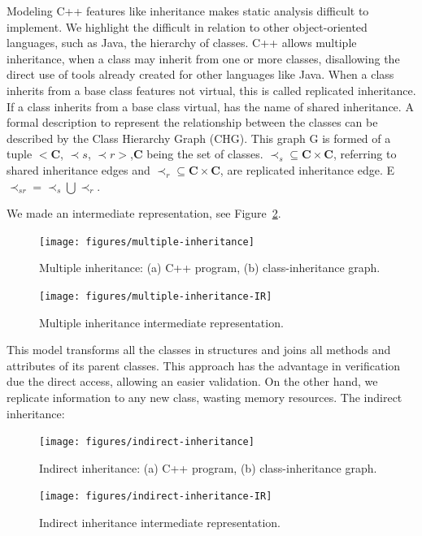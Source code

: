 \documentclass[a4paper]{llncs}
\begin{document}
Modeling C++ features like inheritance makes static analysis difficult to implement. We highlight the difficult in relation to other 
object-oriented languages, such as Java, the hierarchy of classes. C++ allows multiple inheritance, when a class may inherit from 
one or more classes, disallowing the direct use of tools already created for other languages like Java.
When a class inherits from a base class features not virtual, this is called replicated inheritance. If a class inherits from a base 
class virtual, has the name of shared inheritance.
A formal description to represent the relationship between the classes can be described by the Class Hierarchy Graph (CHG). 
This graph G is formed of a tuple $<$\textbf{C},  $\prec s$, $\prec r>$,\textbf{C} being the set of classes. $ 
\prec_s \subseteq \textbf{C} \times \textbf{C}$, referring to shared inheritance edges and $\prec_r \subseteq 
\textbf{C} \times \textbf{C}$, are replicated inheritance edge. E $\prec_{sr} = \prec_s \bigcup \prec_r$.


We made an intermediate representation, see Figure~\ref{figure:multiple-inheritance-IR}.

\begin{figure}[ht]
\centering
\texttt{[image: figures/multiple-inheritance]}
\caption{Multiple inheritance: (a) C++ program, (b) class-inheritance graph.}
\label{figure:multiple-inheritance}
\end{figure}

\begin{figure}[ht]
\centering
\texttt{[image: figures/multiple-inheritance-IR]}
\caption{Multiple inheritance intermediate representation.}
\label{figure:multiple-inheritance-IR}
\end{figure}

This model transforms all the classes in structures and joins all methods and attributes of its parent classes.  This approach has the advantage in verification due the direct access, allowing an easier validation. On the other hand, we replicate information to any new class, wasting memory resources.
The indirect inheritance:

\begin{figure}[ht]
\centering
\texttt{[image: figures/indirect-inheritance]}
\caption{Indirect inheritance: (a) C++ program, (b) class-inheritance graph.}
\label{figure:indirect-inheritance}
\end{figure}

\begin{figure}[ht]
\centering
\texttt{[image: figures/indirect-inheritance-IR]}
\caption{Indirect inheritance intermediate representation.}
\label{figure:indirect-inheritance-IR}
\end{figure}
\end{document}
